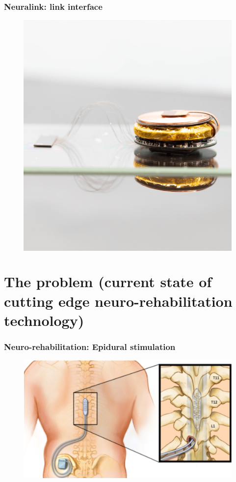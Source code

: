 \documentclass[12pt, aspectratio=169]{beamer}
\begin{document}
\begin{frame}
  \frametitle{Neuralink: link interface}
  \begin{figure}
    \includegraphics[width=0.4\linewidth]{approach-link-1}
  \end{figure}
\end{frame}




\section{The problem (current state of cutting edge neuro-rehabilitation technology)}
\begin{frame}
  \frametitle{Neuro-rehabilitation: Epidural stimulation}
  \begin{figure}
    \includegraphics[width=0.6\linewidth]{epidural_stimulation_spinal_cord}
  \end{figure}
\end{frame}
\end{document}
